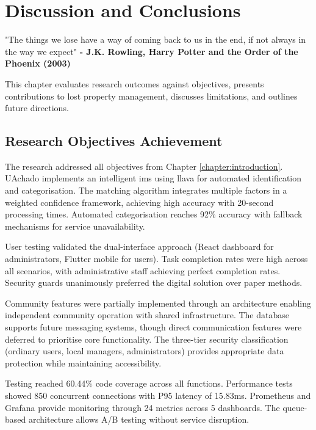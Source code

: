 \chapter{Discussion and Conclusions}
\label{chapter:discussion_conclusions}

\begin{introduction}
"The things we lose have a way of coming back to us in the end, if not always in the way we expect" \textbf{- J.K. Rowling, Harry Potter and the Order of the Phoenix (2003)}
\end{introduction}

This chapter evaluates research outcomes against objectives, presents contributions to lost property management, discusses limitations, and outlines future directions.


\section{Research Objectives Achievement} \label{section:objectives_achievement}

The research addressed all objectives from Chapter \ref{chapter:introduction}. UAchado implements an intelligent \ac{ims} using \ac{llava} for automated identification and categorisation. The matching algorithm integrates multiple factors in a weighted confidence framework, achieving high accuracy with 20-second processing times. Automated categorisation reaches 92\% accuracy with fallback mechanisms for service unavailability.

User testing validated the dual-interface approach (React dashboard for administrators, Flutter mobile for users). Task completion rates were high across all scenarios, with administrative staff achieving perfect completion rates. Security guards unanimously preferred the digital solution over paper methods.

Community features were partially implemented through an architecture enabling independent community operation with shared infrastructure. The database supports future messaging systems, though direct communication features were deferred to prioritise core functionality. The three-tier security classification (ordinary users, local managers, administrators) provides appropriate data protection while maintaining accessibility.

Testing reached 60.44\% code coverage across all functions. Performance tests showed 850 concurrent connections with P95 latency of 15.83ms. Prometheus and Grafana provide monitoring through 24 metrics across 5 dashboards. The queue-based architecture allows A/B testing without service disruption.


